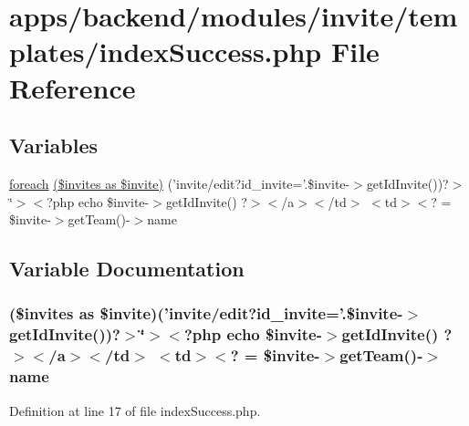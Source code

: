 \hypertarget{backend_2modules_2invite_2templates_2index_success_8php}{\section{apps/backend/modules/invite/templates/index\-Success.php File Reference}
\label{backend_2modules_2invite_2templates_2index_success_8php}
}
\subsection*{Variables}
\begin{DoxyCompactItemize}
\item 
\hyperlink{presse_2modules_2news_2templates_2index_success_8php_abc56db52b2e9a59bcd5c9e45ac5cb332}{foreach} \hyperlink{backend_2modules_2invite_2templates_2index_success_8php_a816dbed12ba0a93da82c2c544782ae95}{(\$invites as \$invite)} ('invite/edit?id\-\_\-invite='.\$invite-\/$>$get\-Id\-Invite())?$>$\char`\"{}$>$$<$?php echo \$invite-\/$>$get\-Id\-Invite() ?$>$$<$/a$>$$<$/td$>$ $<$td$>$$<$? = \$invite-\/$>$get\-Team()-\/$>$name
\end{DoxyCompactItemize}


\subsection{Variable Documentation}
\hypertarget{backend_2modules_2invite_2templates_2index_success_8php_a816dbed12ba0a93da82c2c544782ae95}{
\subsubsection[{(\$invites as \$invite)}]{ (\$invites as \$invite)('invite/edit?id\-\_\-invite='.\$invite-\/$>$get\-Id\-Invite())?$>$\char`\"{}$>$$<$?php echo \$invite-\/$>$get\-Id\-Invite() ?$>$$<$/a$>$$<$/td$>$ $<$td$>$$<$? = \$invite-\/$>$get\-Team()-\/$>$name}}\label{backend_2modules_2invite_2templates_2index_success_8php_a816dbed12ba0a93da82c2c544782ae95}


Definition at line 17 of file index\-Success.\-php.

